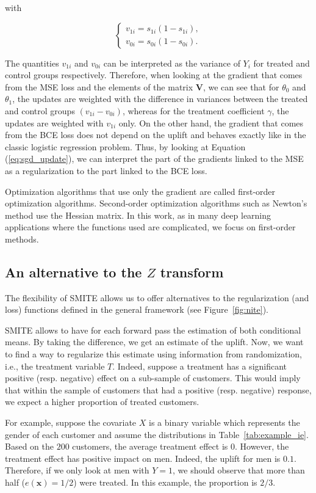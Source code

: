 \documentclass{article}
\def\x{\mathbf x}
\begin{document}
with

\[
\begin{cases} 
      v_{1i} = s_{1i} ( 1 - s_{1i}),  \\
      v_{0i} = s_{0i} ( 1 - s_{0i}).
\end{cases}
\]

The quantities $v_{1i}$ and $v_{0i}$ can be interpreted as the variance of $Y_i$ for treated and control groups respectively. Therefore, when looking at the gradient that comes from the MSE loss and the elements of the matrix $\mathbf{V}$, we can see that for $\theta_0$ and $\theta_1$, the updates are weighted with the difference in variances between the treated and control groups $(v_{1i} - v_{0i})$, whereas for the treatment coefficient $\gamma$, the updates are weighted with $v_{1i}$ only.  On the other hand, the gradient that comes from the BCE loss does not depend on the uplift and behaves exactly like in the classic logistic regression problem. Thus, by looking at Equation (\ref{eq:sgd_update}), we can interpret the part of the gradients linked to the MSE as a regularization to the part linked to the BCE loss.

Optimization algorithms that use only the gradient are called first-order optimization algorithms. Second-order optimization algorithms such as Newton's method use the Hessian matrix. In this work, as in many deep learning applications where the functions used are complicated, we focus on first-order methods. 


\subsection{An alternative to the $Z$ transform} 
\label{sec:smite_ie}

The flexibility of SMITE allows us to offer alternatives to the regularization (and loss) functions defined in the general framework (see Figure~\ref{fig:nite}).

SMITE allows to have for each forward pass the estimation of both conditional means. By taking the difference, we get an estimate of the uplift. Now, we want to find a way to regularize this estimate using information from randomization, i.e., the treatment variable $T$. Indeed, suppose a treatment has a significant positive (resp. negative) effect on a sub-sample of customers. This would imply that within the sample of customers that had a positive (resp. negative) response, we expect a higher proportion of treated customers. 

For example, suppose the covariate $X$ is a binary variable which represents the gender of each customer and assume the distributions in Table~\ref{tab:example_ie}. Based on the $200$ customers, the average treatment effect is $0$. However, the treatment effect has positive impact on men. Indeed, the uplift for men is $0.1$. Therefore, if we only look at men with $Y=1$, we should observe that more than half ($e(\x) = 1/2$) were treated. In this example, the proportion is $2/3$. 
\end{document}
